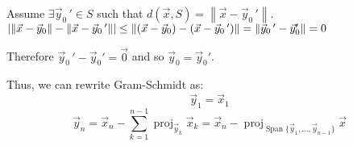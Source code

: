 \documentclass[letterpaper,12pt,fleqn]{article}
\newcommand{\vx}{\vec{x}}
\newcommand{\vy}{\vec{y}}
\newcommand{\vo}{\vec{0}}
\newcommand{\norm}[1]{\left\|#1\right\|}
\DeclareMathOperator{\spn}{Span}
\DeclareMathOperator{\proj}{proj}
\begin{document}
\begin{theproof}
  Assume $\exists\vy_0\,'\in S$ such that $d(\vx,S)=\norm{\vx-\vy_0\,'}$. \\
  $\abs{\norm{\vx-\vy_0}-\norm{\vx-\vy_0\,'}}\le
  \norm{(\vx-\vy_0)-(\vx-\vy_0\,')}=\norm{\vy_0\,'-\vy_0'}=0$

  Therefore $\vy_0\,'-\vy_0'=\vo$ and so $\vy_0=\vy_0'$.
\end{theproof}

Thus, we can rewrite Gram-Schmidt as:
\[\vy_1=\vx_1\]
\[\vy_n=\vx_n-\sum_{k=1}^{n-1}\proj_{\vy_k}\vx_k=
\vx_n-\proj_{\spn\{\vy_1,\ldots,\vy_{n-1}\}}\vx\]
\end{document}
